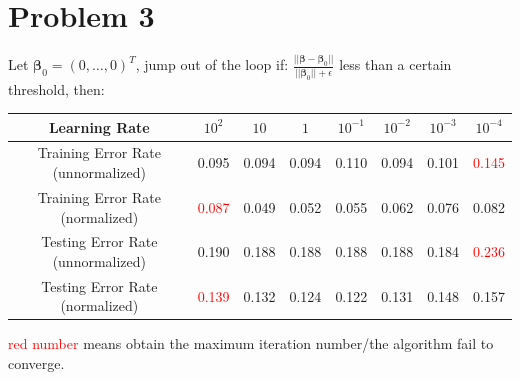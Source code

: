 \documentclass[12pt]{article}
\begin{document}
\section*{Problem 3}

Let $\bm{\beta}_0 = (0, \dots, 0)^T$, jump out of the loop if: $ \frac{|| \bm{\beta} - \bm{\beta}_0 ||}{||\bm{\beta}_0|| + \epsilon}$ less than a certain threshold, then:

\begin{tabular}{ |c|ccccccc| } 
\hline
Learning Rate & $10^2$ & $10$  & $1$  & $10^{-1}$  &  $10^{-2}$  &  $10^{-3}$  &  $10^{-4}$  \\
 \hline
 Training Error Rate (unnormalized) & 0.095  & 0.094  & 0.094 & 0.110 & 0.094 & 0.101 & \textcolor{red}{0.145} \\ 
 Training Error Rate (normalized) &  \textcolor{red}{0.087} &  0.049 & 0.052 &  0.055 & 0.062 & 0.076 & 0.082 \\ 
 Testing Error Rate (unnormalized) & 0.190  & 0.188  & 0.188 & 0.188 & 0.188 & 0.184 & \textcolor{red}{0.236} \\ 
 Testing Error Rate (normalized) & \textcolor{red}{0.139}  & 0.132  & 0.124  & 0.122 & 0.131 & 0.148 & 0.157 \\ 
 \hline
\end{tabular}


\textcolor{red}{red number} means obtain the maximum iteration number/the algorithm fail to converge.
\end{document}

